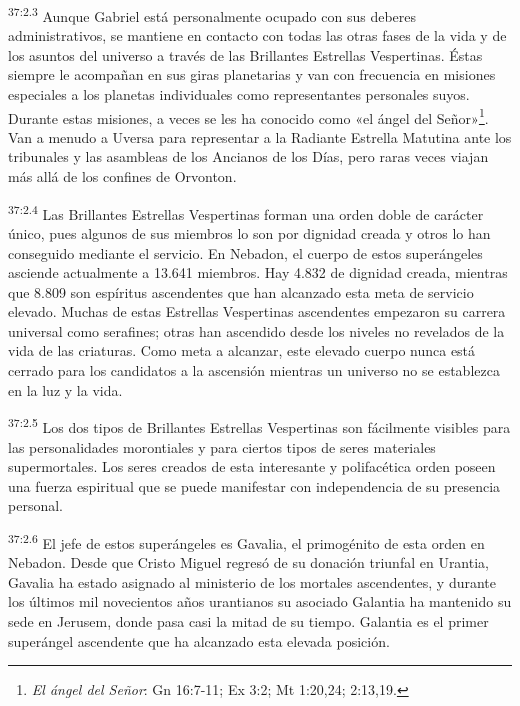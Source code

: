 \par
\textsuperscript{37:2.3} Aunque Gabriel está personalmente ocupado con sus deberes administrativos, se mantiene en contacto con todas las otras fases de la vida y de los asuntos del universo a través de las Brillantes Estrellas Vespertinas. Éstas siempre le acompañan en sus giras planetarias y van con frecuencia en misiones especiales a los planetas individuales como representantes personales suyos. Durante estas misiones, a veces se les ha conocido como «el ángel del Señor»\footnote{\textit{El ángel del Señor}: Gn 16:7-11; Ex 3:2; Mt 1:20,24; 2:13,19.}. Van a menudo a Uversa para representar a la Radiante Estrella Matutina ante los tribunales y las asambleas de los Ancianos de los Días, pero raras veces viajan más allá de los confines de Orvonton.

\par
\textsuperscript{37:2.4} Las Brillantes Estrellas Vespertinas forman una orden doble de carácter único, pues algunos de sus miembros lo son por dignidad creada y otros lo han conseguido mediante el servicio. En Nebadon, el cuerpo de estos superángeles asciende actualmente a 13.641 miembros. Hay 4.832 de dignidad creada, mientras que 8.809 son espíritus ascendentes que han alcanzado esta meta de servicio elevado. Muchas de estas Estrellas Vespertinas ascendentes empezaron su carrera universal como serafines; otras han ascendido desde los niveles no revelados de la vida de las criaturas. Como meta a alcanzar, este elevado cuerpo nunca está cerrado para los candidatos a la ascensión mientras un universo no se establezca en la luz y la vida.

\par
\textsuperscript{37:2.5} Los dos tipos de Brillantes Estrellas Vespertinas son fácilmente visibles para las personalidades morontiales y para ciertos tipos de seres materiales supermortales. Los seres creados de esta interesante y polifacética orden poseen una fuerza espiritual que se puede manifestar con independencia de su presencia personal.

\par
\textsuperscript{37:2.6} El jefe de estos superángeles es Gavalia, el primogénito de esta orden en Nebadon. Desde que Cristo Miguel regresó de su donación triunfal en Urantia, Gavalia ha estado asignado al ministerio de los mortales ascendentes, y durante los últimos mil novecientos años urantianos su asociado Galantia ha mantenido su sede en Jerusem, donde pasa casi la mitad de su tiempo. Galantia es el primer superángel ascendente que ha alcanzado esta elevada posición.


